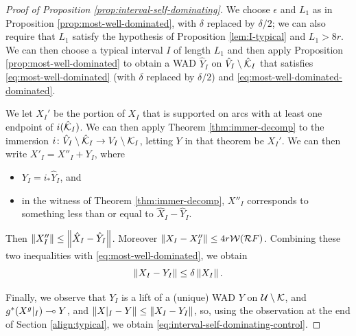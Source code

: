 \begin{proof}[Proof of Proposition \ref{prop:interval-self-dominating}]
We choose $\epsilon$ and $L_1$ as in Proposition \ref{prop:most-well-dominated},
with $\delta$ replaced by $\delta/2$;
we can also require that $L_1$ satisfy the hypothesis of Proposition \ref{lem:I-typical}
and  $L_1 > 8r$.
We can then choose a typical interval $I$ of length $L_1$ and then apply Proposition \ref{prop:most-well-dominated} to obtain a WAD $\hat Y_I$ on $\hat V_I \setminus \hat {\mathcal K}_I$ that satisfies \eqref{eq:most-well-dominated} (with $\delta$ replaced by $\delta/2$) and \eqref{eq:most-well-dominated-dominated}.

We let $X_I'$ be the portion of $X_I$ that is supported on arcs with at least one endpoint of $i(\hat{\mathcal K}_I)$.
We can then apply Theorem \ref{thm:immer-decomp} to the immersion $i\colon \hat V_I \setminus \hat{\mathcal K}_I \to V_I \setminus \mathcal K_I$,
letting $Y$ in that theorem be $X_I'$. 
We can then write $X'_I = X''_I+ Y_I$,
where 
\begin{itemize}
\item
$Y_I = i_*\hat Y_I$, and
\item
in the witness of Theorem \ref{thm:immer-decomp},
$X''_I$ corresponds to something less than or equal to $\hat X_I - \hat Y_I$. 
\end{itemize}

Then $\left\Vert X''_I \right\Vert \le \left\Vert \hat X_I - \hat Y_I \right\Vert$.
Moreover $\left\Vert X_I - X_I'' \right\Vert \le 4r \mathcal W(\mathcal R F)$.
Combining these two inequalities with \eqref{eq:most-well-dominated},
we obtain
\begin{equation} \label{eq:what-we-wanted}
\left\Vert X_I - Y_I \right\Vert \le \delta \left\Vert X_I \right\Vert.
\end{equation}

Finally,
we observe that $Y_I$ is a lift of a (unique) WAD $Y$ on $\mathcal U \setminus \mathcal K$, 
and $g^*(X^g|_I) \multimap Y$,
and $\left\Vert X|_I - Y \right\Vert \le \left\Vert X_I - Y_I \right\Vert$, so,
using the observation at the end of Section \ref{align:typical},
we obtain \eqref{eq:interval-self-dominating-control}.
\end{proof}


